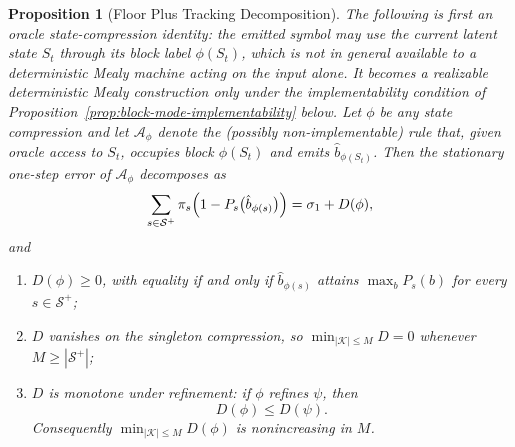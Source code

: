 \documentclass[12pt]{article}
\newtheorem{proposition}[theorem]{Proposition}
\theoremstyle{definition}
\newcommand{\Splus}{\mathcal S^{+}}
\begin{document}
\begin{proposition}[Floor Plus Tracking Decomposition]
\label{prop:grounding-tracking}
The following is first an \emph{oracle} state-compression identity: the
emitted symbol may use the current latent state $S_t$ through its block
label $\phi(S_t)$, which is not in general available to a deterministic
Mealy machine acting on the input alone.  It becomes a realizable
deterministic Mealy construction only under the implementability condition
of Proposition~\ref{prop:block-mode-implementability} below.  Let $\phi$ be
any state compression and let $\mathcal A_\phi$ denote the (possibly
non-implementable) rule that, given oracle access to $S_t$, occupies block
$\phi(S_t)$ and emits $\hat b_{\phi(S_t)}$.  Then the stationary one-step
error of $\mathcal A_\phi$ decomposes as
\[
\sum_{s\in\Splus}\pi_s\Bigl(1-P_s\bigl(\hat b_{\phi(s)}\bigr)\Bigr)
=
\sigma_1+D(\phi),
\]
and
\begin{enumerate}[label=(\roman*)]
\item $D(\phi)\ge0$, with equality if and only if $\hat b_{\phi(s)}$ attains
$\max_bP_s(b)$ for every $s\in\Splus$;
\item $D$ vanishes on the singleton compression, so
$\min_{|\mathcal K|\le M}D=0$ whenever $M\ge|\Splus|$;
\item $D$ is monotone under refinement: if $\phi$ refines $\psi$, then
\[
D(\phi)\le D(\psi).
\]
Consequently $\min_{|\mathcal K|\le M}D(\phi)$ is nonincreasing in $M$.
\end{enumerate}
\end{proposition}
\end{document}
